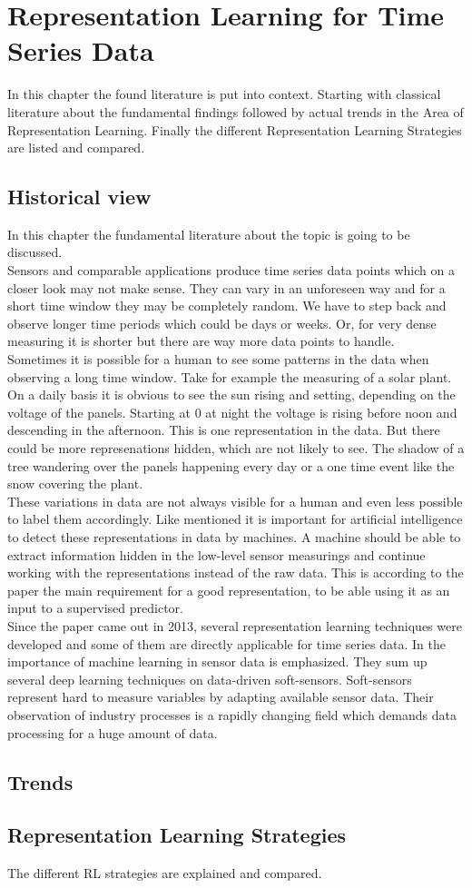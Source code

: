 \chapter{Representation Learning for Time Series Data}\label{review}
In this chapter the found literature is put into context. Starting with classical literature about the fundamental findings followed by actual trends in the Area of Representation Learning. Finally the different Representation Learning Strategies are listed and compared.
\section{Historical view}
In this chapter the fundamental literature about the topic is going to be discussed. \\
Sensors and comparable applications produce time series data points which on a closer look may not make sense. They can vary in an unforeseen way and for a short time window they may be completely random. We have to step back and observe longer time periods which could be days or weeks. Or, for very dense measuring it is shorter but there are way more data points to handle.\\
Sometimes it is possible for a human to see some patterns in the data when observing a long time window. Take for example the measuring of a solar plant. On a daily basis it is obvious to see the sun rising and setting, depending on the voltage of the panels. Starting at 0 at night the voltage is rising before noon and descending in the afternoon. This is one representation in the data. But there could be more represenations hidden, which are not likely to see. The shadow of a tree wandering over the panels happening every day or a one time event like the snow covering the plant. \\
These variations in data are not always visible for a human and even less possible to label them accordingly. Like \cite{bengio_representation_2013} mentioned it is important for artificial intelligence to detect these representations in data by machines. A machine should be able to extract information hidden in the low-level sensor measurings and continue working with the representations instead of the raw data. This is according to the paper the main requirement for a good representation, to be able using it as an input to a supervised predictor.\\
Since the paper came out in 2013, several representation learning techniques were developed and some of them are directly applicable for time series data. In \cite{sun_survey_2021} the importance of machine learning in sensor data is emphasized. They sum up several deep learning techniques on data-driven soft-sensors. Soft-sensors represent hard to measure variables by adapting available sensor data. Their observation of industry processes is a rapidly changing field which demands data processing for a huge amount of data.
\section{Trends}
\section{Representation Learning Strategies}
The different RL strategies are explained and compared.
